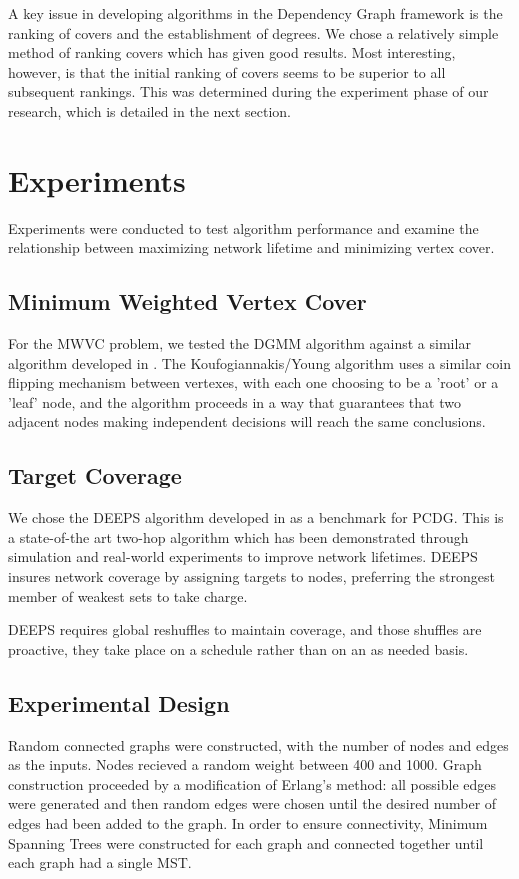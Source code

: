A key issue in developing algorithms in the Dependency Graph framework is the ranking of covers and the establishment of degrees. We chose a relatively simple method of ranking covers which has given good results. Most interesting, however, is that the initial ranking of covers seems to be superior to all subsequent rankings. This was determined during the experiment phase of our research, which is detailed in the next section.

\section{Experiments}
\label{sec:experiment}
Experiments were conducted to test algorithm performance and examine the relationship between maximizing network lifetime and minimizing vertex cover.
\subsection{Minimum Weighted Vertex Cover}
\label{sub:mwvc-exp}

For the MWVC problem, we tested the DGMM algorithm against a similar algorithm developed in \cite{1582746}. The Koufogiannakis/Young algorithm uses a similar coin flipping mechanism between vertexes, with each one choosing to be a 'root' or a 'leaf' node, and the algorithm proceeds in a way that guarantees that two adjacent nodes making independent decisions will reach the same conclusions. 

\subsection{Target Coverage}

We chose the DEEPS algorithm developed in \cite{1640702} as a benchmark for PCDG. This is a state-of-the art two-hop algorithm which has been demonstrated through simulation and real-world experiments to improve network lifetimes. DEEPS insures network coverage by assigning targets to nodes, preferring the strongest member of weakest sets to take charge. 

DEEPS requires global reshuffles to maintain coverage, and those shuffles are proactive, they take place on a schedule rather than on an as needed basis.

\subsection{Experimental Design}
\label{sub:exp-design}
Random connected graphs were constructed, with the number of nodes and edges as the inputs. Nodes recieved a random weight between 400 and 1000. Graph construction proceeded by a modification of Erlang's method: all possible edges were generated and then random edges were chosen until the desired number of edges had been added to the graph. In order to ensure connectivity, Minimum Spanning Trees were constructed for each graph and connected together until each graph had a single MST. 

